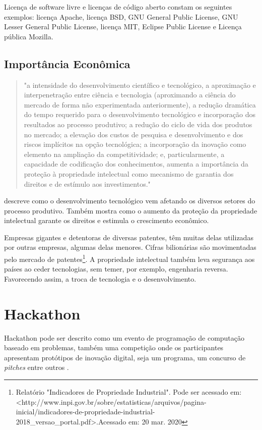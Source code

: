 Licença de software livre e licenças de código aberto constam os seguintes exemplos: licença Apache, licença BSD, GNU General Public License, GNU Lesser General Public License, licença MIT, Eclipse Public License e Licença pública Mozilla.


\subsection{Importância Econômica}

\begin{quote}
    "a intensidade do desenvolvimento científico e tecnológico, a aproximação e interpenetração entre ciência e tecnologia (aproximando a ciência do mercado de forma não experimentada anteriormente), a redução dramática do tempo requerido para o desenvolvimento tecnológico e incorporação dos resultados ao processo produtivo; a redução do ciclo de vida dos produtos no mercado; a elevação dos custos de pesquisa e desenvolvimento e dos riscos implícitos na opção tecnológica; a incorporação da inovação como elemento na ampliação da competitividade; e, particularmente, a capacidade de codificação dos conhecimentos, aumenta a importância da proteção à propriedade intelectual como mecanismo de garantia dos direitos e de estímulo aos investimentos."
\citet{buainain2004inovaccao}\end{quote}

\citet{buainain2004inovaccao} descreve como o desenvolvimento tecnológico vem afetando os diversos setores do processo produtivo. Também mostra como o aumento da proteção da propriedade intelectual garante os direitos e estimula o crescimento econômico. 

Empresas gigantes e detentoras de diversas patentes, têm muitas delas utilizadas por outras empresas, algumas delas menores. Cifras bilionárias são movimentadas pelo mercado de patentes\footnote{Relatório "Indicadores de Propriedade Industrial". Pode ser acessado em: <http://www.inpi.gov.br/sobre/estatisticas/arquivos/pagina-inicial/indicadores-de-propriedade-industrial-2018\_versao\_portal.pdf>.Acessado em: 20 mar. 2020}. A propriedade intelectual também leva segurança aos países ao ceder tecnologias, sem temer, por exemplo, engenharia reversa. Favorecendo assim, a troca de tecnologia e o desenvolvimento.







\section{Hackathon}
Hackathon pode ser descrito como um evento de programação de computação baseado em problemas, também uma competição onde os participantes apresentam protótipos de inovação digital, seja um programa, um concurso de \textit{pitches} entre outros \citep{computinghandbook2014}.

